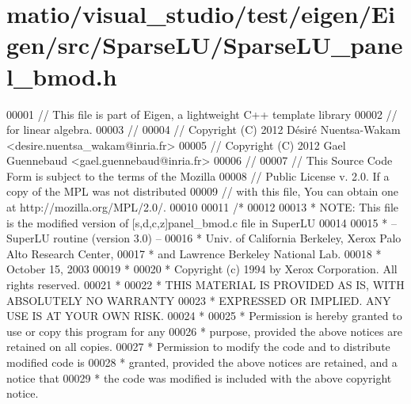 \hypertarget{matio_2visual__studio_2test_2eigen_2_eigen_2src_2_sparse_l_u_2_sparse_l_u__panel__bmod_8h_source}{}\section{matio/visual\+\_\+studio/test/eigen/\+Eigen/src/\+Sparse\+L\+U/\+Sparse\+L\+U\+\_\+panel\+\_\+bmod.h}
\label{matio_2visual__studio_2test_2eigen_2_eigen_2src_2_sparse_l_u_2_sparse_l_u__panel__bmod_8h_source}

\begin{DoxyCode}
00001 \textcolor{comment}{// This file is part of Eigen, a lightweight C++ template library}
00002 \textcolor{comment}{// for linear algebra.}
00003 \textcolor{comment}{//}
00004 \textcolor{comment}{// Copyright (C) 2012 Désiré Nuentsa-Wakam <desire.nuentsa\_wakam@inria.fr>}
00005 \textcolor{comment}{// Copyright (C) 2012 Gael Guennebaud <gael.guennebaud@inria.fr>}
00006 \textcolor{comment}{//}
00007 \textcolor{comment}{// This Source Code Form is subject to the terms of the Mozilla}
00008 \textcolor{comment}{// Public License v. 2.0. If a copy of the MPL was not distributed}
00009 \textcolor{comment}{// with this file, You can obtain one at http://mozilla.org/MPL/2.0/.}
00010 
00011 \textcolor{comment}{/* }
00012 \textcolor{comment}{ }
00013 \textcolor{comment}{ * NOTE: This file is the modified version of [s,d,c,z]panel\_bmod.c file in SuperLU }
00014 \textcolor{comment}{ }
00015 \textcolor{comment}{ * -- SuperLU routine (version 3.0) --}
00016 \textcolor{comment}{ * Univ. of California Berkeley, Xerox Palo Alto Research Center,}
00017 \textcolor{comment}{ * and Lawrence Berkeley National Lab.}
00018 \textcolor{comment}{ * October 15, 2003}
00019 \textcolor{comment}{ *}
00020 \textcolor{comment}{ * Copyright (c) 1994 by Xerox Corporation.  All rights reserved.}
00021 \textcolor{comment}{ *}
00022 \textcolor{comment}{ * THIS MATERIAL IS PROVIDED AS IS, WITH ABSOLUTELY NO WARRANTY}
00023 \textcolor{comment}{ * EXPRESSED OR IMPLIED.  ANY USE IS AT YOUR OWN RISK.}
00024 \textcolor{comment}{ *}
00025 \textcolor{comment}{ * Permission is hereby granted to use or copy this program for any}
00026 \textcolor{comment}{ * purpose, provided the above notices are retained on all copies.}
00027 \textcolor{comment}{ * Permission to modify the code and to distribute modified code is}
00028 \textcolor{comment}{ * granted, provided the above notices are retained, and a notice that}
00029 \textcolor{comment}{ * the code was modified is included with the above copyright notice.}

\end{DoxyCode}
